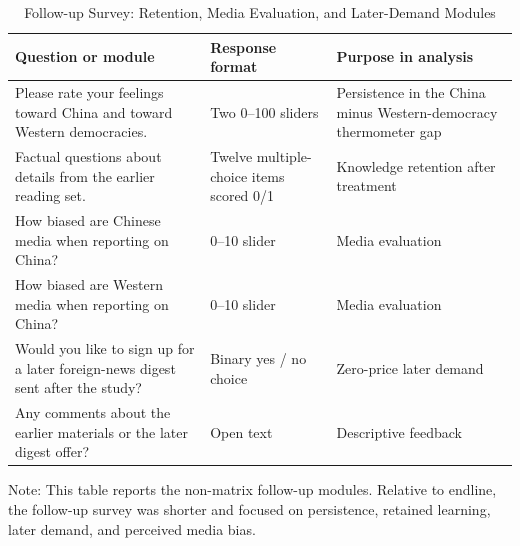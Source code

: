 \begin{table}[H]
\centering
\begin{threeparttable}
\caption{Follow-up Survey: Retention, Media Evaluation, and Later-Demand Modules}
\label{tab:followup_survey_selection}
\scriptsize
\setlength{\tabcolsep}{4pt}
\begin{tabularx}{\textwidth}{p{7.1cm} p{3.4cm} X}
\toprule
\textbf{Question or module} & \textbf{Response format} & \textbf{Purpose in analysis} \\
\midrule
Please rate your feelings toward China and toward Western democracies. & Two 0--100 sliders & Persistence in the China minus Western-democracy thermometer gap \\
\addlinespace
Factual questions about details from the earlier reading set. & Twelve multiple-choice items scored 0/1 & Knowledge retention after treatment \\
\addlinespace
How biased are Chinese media when reporting on China? & 0--10 slider & Media evaluation \\
\addlinespace
How biased are Western media when reporting on China? & 0--10 slider & Media evaluation \\
\addlinespace
Would you like to sign up for a later foreign-news digest sent after the study? & Binary yes / no choice & Zero-price later demand \\
\addlinespace
Any comments about the earlier materials or the later digest offer? & Open text & Descriptive feedback \\
\bottomrule
\end{tabularx}
\begin{tablenotes}[flushleft]
\footnotesize
\item Note: This table reports the non-matrix follow-up modules. Relative to endline, the follow-up survey was shorter and focused on persistence, retained learning, later demand, and perceived media bias.
\end{tablenotes}
\end{threeparttable}
\end{table}
